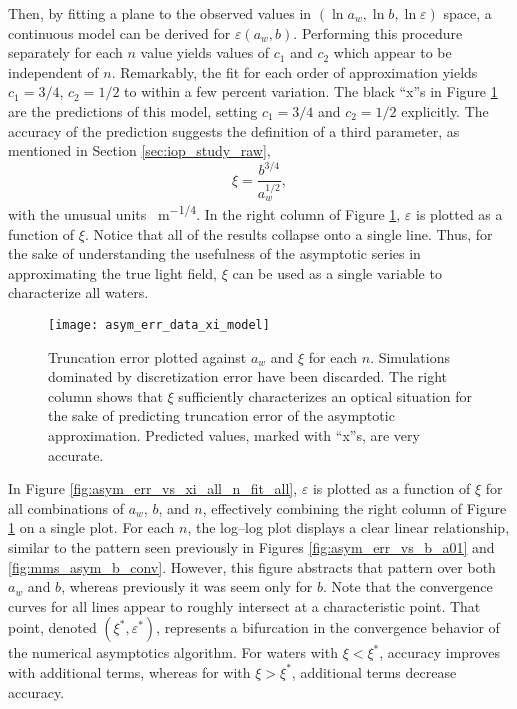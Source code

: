 Then, by fitting a plane to the observed values in $(\ln a_w, \ln b, \ln \varepsilon)$ space, a continuous model can be derived for $\varepsilon(a_w, b)$.
Performing this procedure separately for each $n$ value yields values of $c_1$ and $c_2$ which appear to be independent of $n$.
Remarkably, the fit for each order of approximation yields $c_1=3/4$, $c_2=1/2$ to within a few percent variation.
The black ``x''s in Figure \ref{fig:asym_err_data_xi_model} are the predictions of this model, setting $c_1=3/4$ and $c_2=1/2$ explicitly.
The accuracy of the prediction suggests the definition of a third parameter, as mentioned in Section \ref{sec:iop_study_raw},
\begin{equation}
  \label{eqn:xi}
  \xi = \frac{b^{3/4}}{a_w^{1/2}},
\end{equation}
with the unusual units \SI{}{\m^{-1/4}}.
In the right column of Figure \ref{fig:asym_err_data_xi_model}, $\varepsilon$ is plotted as a function of $\xi$.
Notice that all of the results collapse onto a single line.
Thus, for the sake of understanding the usefulness of the asymptotic series in approximating the true light field, $\xi$ can be used as a single variable to characterize all waters.

\begin{figure}[H]
  \centering
  \texttt{[image: asym\_err\_data\_xi\_model]}
  \caption{Truncation error plotted against $a_w$ and $\xi$ for each $n$. Simulations dominated by discretization error have been discarded. The right column shows that $\xi$ sufficiently characterizes an optical situation for the sake of predicting truncation error of the asymptotic approximation. Predicted values, marked with ``x''s, are very accurate.}
  \label{fig:asym_err_data_xi_model}
\end{figure}

In Figure \ref{fig:asym_err_vs_xi_all_n_fit_all}, $\varepsilon$ is plotted as a function of $\xi$ for all combinations of $a_w$, $b$, and $n$, effectively combining the right column of Figure \ref{fig:asym_err_data_xi_model} on a single plot.
For each $n$, the log--log plot displays a clear linear relationship, similar to the pattern seen previously in Figures \ref{fig:asym_err_vs_b_a01} and \ref{fig:mms_asym_b_conv}.
However, this figure abstracts that pattern over both $a_w$ and $b$, whereas previously it was seem only for $b$.
Note that the convergence curves for all lines appear to roughly intersect at a characteristic point.
That point, denoted $(\xi^*, \varepsilon^*)$, represents a bifurcation in the convergence behavior of the numerical asymptotics algorithm.
For waters with $\xi < \xi^*$, accuracy improves with additional terms, whereas for with $\xi > \xi^*$, additional terms decrease accuracy.

